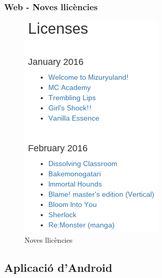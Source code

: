 \documentclass{beamer}
\begin{document}
	\begin{frame}
	\frametitle{Web - Noves llicències}
		\begin{figure}
			\centering
			\includegraphics[scale=0.4]{new_licenses.png}
			\caption{Noves llicències}
		\end{figure}
	\end{frame}


	\begin{frame}
		\section{Aplicació d'Android}
	\end{frame}
\end{document}
